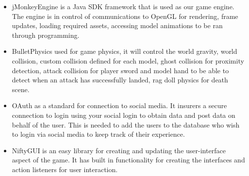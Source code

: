 \documentclass[letterpaper]{article}
\begin{document}
			\begin{itemize}
				\item jMonkeyEngine is a Java SDK framework that is used as our game engine. The engine is in control of communications to OpenGL for rendering, frame updates, loading required assets, accessing model animations to be ran through programming.
				\item BulletPhysics used for game physics, it will control the world gravity, world collision, custom collision defined for each model, ghost collision for proximity detection, attack collision for player sword and model hand to be able to detect when an attack has successfully landed, rag doll physics for death scene.
				\item OAuth as a standard for connection to social media. It insurers a secure connection to login using your social login to obtain data and post data on behalf of the user. This is needed to add the users to the database who wish to login via social media to keep track of their experience.
				\item NiftyGUI is an easy library for creating and updating the user-interface aspect of the game. It has built in functionality for creating the interfaces and action listeners for user interaction.
			\end{itemize}
			
		\vspace{0.2in}
		\section*{\colorbox{blue}{}}
		\vspace{0.1in}
			
			
			
		\vspace{0.2in}
		\section*{\colorbox{blue}{}}
		\vspace{0.1in}
			
\end{document}
